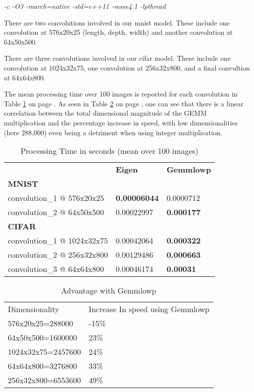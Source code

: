 \documentclass[12pt]{article}
\begin{document}
\textit{-c -O3 -march=native -std=c++11 -msse4.1 -lpthread}

There are two convolutions involved in our mnist model. These include one convolution at 576x20x25 (length, depth, width) and another convolution at 64x50x500.

There are three convolutions involved in our cifar model. These include one convolution at 1024x32x75, one convolution at 256x32x800, and a final convultion at 64x64x800.

The mean processing time over 100 images is reported for each convolution in Table \ref{table:1} on page \pageref{table:1}. As seen in Table \ref{table:2} on page \pageref{table:2}, one can see that there is a linear correlation between the total dimensional magnitude of the GEMM multiplication and the percentage increase in speed, with low dimensionalities (here 288,000) even being a detriment when using integer multiplication.

\begin{table}[h]
\centering
\caption{Processing Time in seconds (mean over 100 images)}
\label{table:1}
\begin{tabular}{lll}
                            & \textbf{Eigen}      & \textbf{Gemmlowp} \\
\textbf{MNIST}              &                     &                   \\
convolution\_1 @ 576x20x25  & \textbf{0.00006044} & 0.0000712         \\
convolution\_2 @ 64x50x500  & 0.00022997          & \textbf{0.000177} \\
\textbf{CIFAR}              &                     &                   \\
convolution\_1 @ 1024x32x75 & 0.00042064          & \textbf{0.000322} \\
convolution\_2 @ 256x32x800 & 0.00129486          & \textbf{0.000663} \\
convolution\_3 @ 64x64x800  & 0.00046174          & \textbf{0.00031} 
\end{tabular}
\end{table}

\begin{table}[h]
\centering
\caption{Advantage with Gemmlowp}
\label{table:2}
\begin{tabular}{ll}
Dimensionality     & Increase In speed using Gemmlowp \\
576x20x25=288000   & -15\%                            \\
64x50x500=1600000  & 23\%                             \\
1024x32x75=2457600 & 24\%                             \\
64x64x800=3276800  & 33\%                             \\
256x32x800=6553600 & 49\%                            
\end{tabular}
\end{table}
\end{document}
